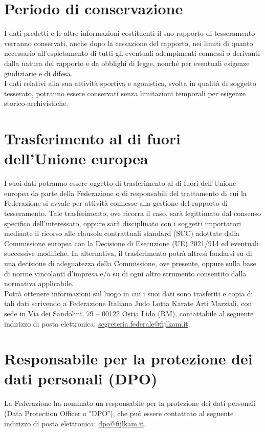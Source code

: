 \documentclass{djts}
\begin{document}
	\section{Periodo di conservazione}
	I dati predetti e le altre informazioni costituenti il suo rapporto di tesseramento verranno conservati, anche dopo la cessazione del rapporto, nei limiti di quanto necessario all'espletamento di tutti gli eventuali adempimenti connessi o derivanti dalla natura del rapporto e da obblighi di legge, nonché per eventuali esigenze giudiziarie e di difesa. \\
	I dati relativi alla sua attività sportiva e agonistica, svolta in qualità di soggetto tesserato, potranno essere conservati senza limitazioni temporali per esigenze storico-archivistiche.
	
	\section{Trasferimento al di fuori dell'Unione europea}
	I suoi dati potranno essere oggetto di trasferimento al di fuori dell'Unione europea da parte della Federazione o di responsabili del trattamento di cui la Federazione si avvale per attività connesse alla gestione del rapporto di tesseramento. Tale trasferimento, ove ricorra il caso, sarà legittimato dal consenso specifico dell'interessato, oppure sarà disciplinato con i soggetti importatori mediante il ricorso alle clausole contrattuali standard (SCC) adottate dalla Commissione europea con la Decisione di Esecuzione (UE) 2021/914 ed eventuali successive modifiche. In alternativa, il trasferimento potrà altresì fondarsi su di una decisione di adeguatezza della Commissione, ove presente, oppure sulla base di norme vincolanti d'impresa e/o su di ogni altro strumento consentito dalla normativa applicabile. \\
	Potrà ottenere informazioni sul luogo in cui i suoi dati sono trasferiti e copia di tali dati scrivendo a Federazione Italiana Judo Lotta Karate Arti Marziali, con sede in Via dei Sandolini, 79 – 00122 Ostia Lido (RM), contattabile al seguente indirizzo di posta elettronica: \href{mailto:segreteria.federale@fijlkam.it}{segreteria.federale@fijlkam.it}.
	
	\section*{Responsabile per la protezione dei dati personali (DPO)}
	La Federazione ha nominato un responsabile per la protezione dei dati personali (Data Protection Officer o
	"DPO"), che può essere contattato al seguente indirizzo di posta elettronica: \href{mailto:dpo@fijlkam.it}{dpo@fijlkam.it}.
	
\end{document}
